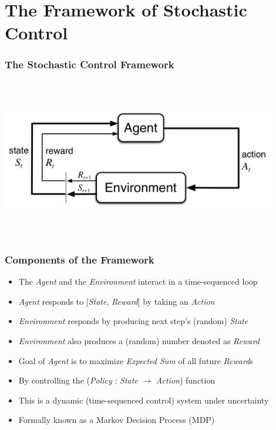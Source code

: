 \documentclass[handout]{beamer}
\begin{document}
\section{The Framework of Stochastic Control}

\begin{frame}
\frametitle{The Stochastic Control Framework}
\includegraphics[width=12cm, height=7cm]{../finance/cme241/MDP.png}
\end{frame}

\begin{frame}
\frametitle{Components of the Framework}
\pause
\begin{itemize}[<+->]
\item The {\em Agent} and the {\em Environment} interact in a time-sequenced loop
\item {\em Agent} responds to [{\em State}, {\em Reward}] by taking an {\em Action}
\item {\em Environment} responds by producing next step's (random) {\em State}
\item {\em Environment} also produces a (random) number denoted as {\em Reward}
\item Goal of {\em Agent} is to maximize {\em Expected Sum} of all future {\em Reward}s
\item By controlling the ({\em Policy} : {\em State} $\rightarrow$ {\em Action}) function
\item This is a dynamic (time-sequenced control) system under uncertainty
\item Formally known as a Markov Decision Process (MDP)
\end{itemize}
\end{frame}
\end{document}
